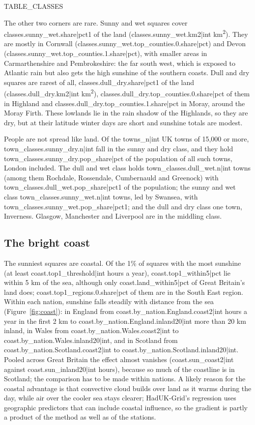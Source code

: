 \documentclass[11pt,a4paper]{article}
\begin{document}
{{TABLE_CLASSES}}

The other two corners are rare. Sunny and wet squares cover {{classes.sunny_wet.share|pct1}} of the land ({{classes.sunny_wet.km2|int}} km\textsuperscript{2}). They are mostly in Cornwall ({{classes.sunny_wet.top_counties.0.share|pct}}) and Devon ({{classes.sunny_wet.top_counties.1.share|pct}}), with smaller areas in Carmarthenshire and Pembrokeshire: the far south west, which is exposed to Atlantic rain but also gets the high sunshine of the southern coasts. Dull and dry squares are rarest of all, {{classes.dull_dry.share|pct1}} of the land ({{classes.dull_dry.km2|int}} km\textsuperscript{2}), {{classes.dull_dry.top_counties.0.share|pct}} of them in Highland and {{classes.dull_dry.top_counties.1.share|pct}} in Moray, around the Moray Firth. These lowlands lie in the rain shadow of the Highlands, so they are dry, but at their latitude winter days are short and sunshine totals are modest.

People are not spread like land. Of the {{towns_n|int}} UK towns of 15,000 or more, {{town_classes.sunny_dry.n|int}} fall in the sunny and dry class, and they hold {{town_classes.sunny_dry.pop_share|pct}} of the population of all such towns, London included. The dull and wet class holds {{town_classes.dull_wet.n|int}} towns (among them Rochdale, Rossendale, Cumbernauld and Greenock) with {{town_classes.dull_wet.pop_share|pct1}} of the population; the sunny and wet class {{town_classes.sunny_wet.n|int}} towns, led by Swansea, with {{town_classes.sunny_wet.pop_share|pct1}}; and the dull and dry class one town, Inverness. Glasgow, Manchester and Liverpool are in the middling class.

\subsection{The bright coast}

The sunniest squares are coastal. Of the 1\% of squares with the most sunshine (at least {{coast.top1_threshold|int}} hours a year), {{coast.top1_within5|pct}} lie within 5 km of the sea, although only {{coast.land_within5|pct}} of Great Britain's land does; {{coast.top1_regions.0.share|pct}} of them are in the South East region. Within each nation, sunshine falls steadily with distance from the sea (Figure~\ref{fig:coast}): in England from {{coast.by_nation.England.coast2|int}} hours a year in the first 2 km to {{coast.by_nation.England.inland20|int}} more than 20 km inland, in Wales from {{coast.by_nation.Wales.coast2|int}} to {{coast.by_nation.Wales.inland20|int}}, and in Scotland from {{coast.by_nation.Scotland.coast2|int}} to {{coast.by_nation.Scotland.inland20|int}}. Pooled across Great Britain the effect almost vanishes ({{coast.sun_coast2|int}} against {{coast.sun_inland20|int}} hours), because so much of the coastline is in Scotland; the comparison has to be made within nations. A likely reason for the coastal advantage is that convective cloud builds over land as it warms during the day, while air over the cooler sea stays clearer; HadUK-Grid's regression uses geographic predictors that can include coastal influence, so the gradient is partly a product of the method as well as of the stations.
\end{document}

